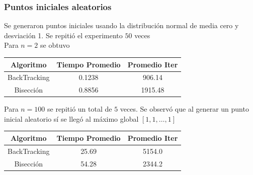 \documentclass[11pt,letterpaper]{article}
\theoremstyle{definition}
\theoremstyle{definition}
\theoremstyle{definition}
\begin{document}
\subsubsection{Puntos iniciales aleatorios}
Se generaron puntos iniciales usando la distribución normal de media cero y desviación 1. Se repitió el experimento $ 50 $ veces
\\
Para $ n = 2 $ se obtuvo
\begin{center}
	\begin{tabular}{ccc}
		\hline
		Algoritmo & Tiempo Promedio & Promedio Iter \\
		\hline
		BackTracking & 0.1238 & 906.14 \\
		Bisección     & 0.8856 & 1915.48\\
		\hline
	\end{tabular}
\end{center}
Para $ n = 100 $ se repitió un total de $ 5 $  veces. Se observó que al generar un punto inicial aleatorio sí se llegó al máximo global $[1,1,\dots, 1]$
\begin{center}
	\begin{tabular}{ccc}
		\hline
		Algoritmo & Tiempo Promedio & Promedio Iter \\
		\hline
		BackTracking & 25.69 & 5154.0 \\
		Bisección     & 54.28 & 2344.2\\
		\hline
	\end{tabular}
\end{center}
\end{document}
